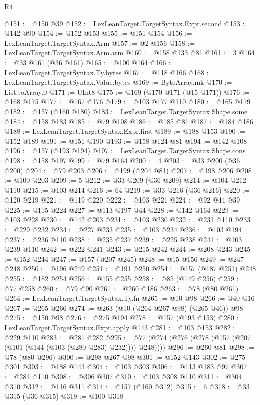 \begin{lexlean}{R4}
\begin{coremodule}
@151 := @150 @39
@152 := LexLeanTarget.TargetSyntax.Expr.second
@153 := @142 @90
@154 := @152 @153
@155 := @151 @154
@156 := LexLeanTarget.TargetSyntax.Arm
@157 := @2 @156
@158 := LexLeanTarget.TargetSyntax.Arm.arm
@160 := @158 @133 @81
@161 := 3
@164 := @33 @161 (@36 @161)
@165 := @100 @164
@166 := LexLeanTarget.TargetSyntax.Ty.bytes
@167 := @118 @166
@168 := LexLeanTarget.TargetSyntax.Value.bytes
@169 := ByteArray.mk
@170 := List.toArray.{0}
@171 := UInt8
@175 := @169 (@170 @171 (@15 @171))
@176 := @168 @175
@177 := @167 @176
@179 := @103 @177 @110
@180 := @165 @179
@182 := @157 (@160 @180)
@183 := LexLeanTarget.TargetSyntax.Shape.some
@184 := @158 @183
@185 := @79 @108
@186 := @185 @81
@187 := @184 @186
@188 := LexLeanTarget.TargetSyntax.Expr.first
@189 := @188 @153
@190 := @152 @189
@191 := @151 @190
@193 := @158 @124 @81
@194 := @142 @108
@196 := @157 (@193 @194)
@197 := LexLeanTarget.TargetSyntax.Shape.cons
@198 := @158 @197
@199 := @79 @164
@200 := 4
@203 := @33 @200 (@36 @200)
@204 := @79 @203
@206 := @199 (@204 @81)
@207 := @198 @206
@208 := @100 @203
@209 := 5
@212 := @33 @209 (@36 @209)
@214 := @104 @212 @110
@215 := @103 @214
@216 := 64
@219 := @33 @216 (@36 @216)
@220 := @120 @219
@221 := @119 @220
@222 := @103 @221
@224 := @92 @44 @39
@225 := @115 @224
@227 := @113 @197 @44
@228 := @142 @164
@229 := @103 @228
@230 := @142 @203
@231 := @103 @230
@232 := @231 @110
@233 := @229 @232
@234 := @227 @233
@235 := @103 @234
@236 := @103 @194
@237 := @236 @110
@238 := @235 @237
@239 := @225 @238
@241 := @103 @239 @110
@242 := @222 @241
@243 := @215 @242
@244 := @208 @243
@245 := @152 @244
@247 := @157 (@207 @245)
@248 := @15 @156
@249 := @247 @248
@250 := @196 @249
@251 := @191 @250
@254 := @157 (@187 @251) @248
@255 := @182 @254
@256 := @155 @255
@258 := @85 (@149 @256)
@259 := @77 @258
@260 := @79 @90
@261 := @260 @186
@263 := @78 (@80 @261)
@264 := LexLeanTarget.TargetSyntax.Ty.fn
@265 := @10 @98
@266 := @40 @16
@267 := @265 @266
@274 := @263 (@10 (@264 @267 @98) (@265 @46)) @98
@275 := @150 @98
@276 := @275 @194
@278 := @157 (@193 @153)
@280 := LexLeanTarget.TargetSyntax.Expr.apply @143
@281 := @103 @153
@282 := @229 @110
@283 := @281 @282
@295 := @77 (@274 (@276 (@278 (@157 (@207 (@101 (@144 (@103 (@280 @283) @232)))) @248))))
@296 := @260 @81
@298 := @78 (@80 @296)
@300 := @298 @267 @98
@301 := @152 @143
@302 := @275 @301
@303 := @188 @143
@304 := @103 @303
@306 := @113 @183 @97
@307 := @281 @110
@308 := @306 @307
@310 := @103 @308 @110
@311 := @304 @310
@312 := @116 @311
@314 := @157 (@160 @312)
@315 := 6
@318 := @33 @315 (@36 @315)
@319 := @100 @318

\end{coremodule}
\end{lexlean}
